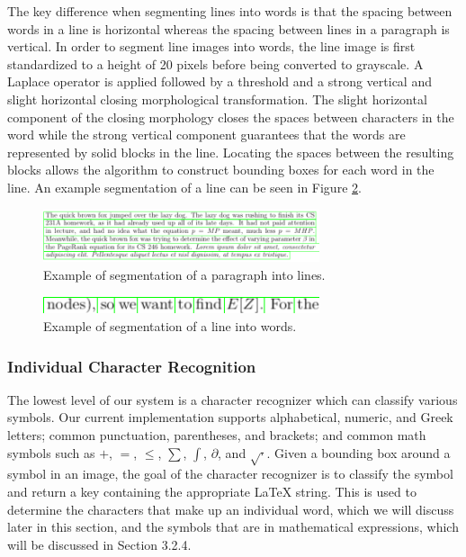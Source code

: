 \documentclass[10pt]{IEEEtran}
\newcommand{\latex}{\LaTeX\xspace}
\begin{document}
The key difference when segmenting lines into words is that the spacing between words in a line is horizontal whereas the spacing between lines in a paragraph is vertical. In order to segment line images into words, the line image is first standardized to a height of 20 pixels before being converted to grayscale. A Laplace operator is applied followed by a threshold and a strong vertical and slight horizontal closing morphological transformation. The slight horizontal component of the closing morphology closes the spaces between characters in the word while the strong vertical component guarantees that the words are represented by solid blocks in the line. Locating the spaces between the resulting blocks allows the algorithm to construct bounding boxes for each word in the line. An example segmentation of a line can be seen in Figure \ref{fig:line1}.

\begin{figure}[h]
  \centering
    \includegraphics[width=3.2in]{paragraph2-bounds.png}
  \caption{Example of segmentation of a paragraph into lines.}
  \label{fig:paragraph1}
\end{figure}

\begin{figure}[h]
  \centering
    \includegraphics[width=3.2in]{line1.png}
  \caption{Example of segmentation of a line into words.}
  \label{fig:line1}
\end{figure}

\subsubsection{Individual Character Recognition}

The lowest level of our system is a character recognizer which can classify various symbols. Our current implementation supports alphabetical, numeric, and Greek letters; common punctuation, parentheses, and brackets; and common math symbols such as $+$, $=$,  $\le$, $\sum$, $\int$, $\partial$, and $\sqrt{\cdot}$. Given a bounding box around a symbol in an image, the goal of the character recognizer is to classify the symbol and return a key containing the appropriate \latex string. This is used to determine the characters that make up an individual word, which we will discuss later in this section, and the symbols that are in mathematical expressions, which will be discussed in Section 3.2.4.
\end{document}
